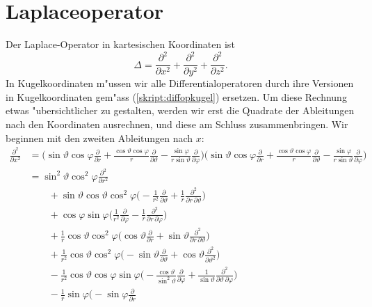 \section{Laplaceoperator}
%
Der Laplace-Operator in kartesischen Koordinaten ist
\[
\Delta
=
\frac{\partial^2}{\partial x^2}
+
\frac{\partial^2}{\partial y^2}
+
\frac{\partial^2}{\partial z^2}.
\]
In Kugelkoordinaten m"ussen wir alle Differentialoperatoren durch
ihre Versionen in Kugelkoordinaten gem"ass (\ref{skript:diffopkugel}) 
ersetzen.
Um diese Rechnung etwas "ubersichtlicher zu gestalten, werden wir erst
die Quadrate der Ableitungen nach den Koordinaten ausrechnen, und diese
am Schluss zusammenbringen.
Wir beginnen mit den zweiten Ableitungen nach $x$:
\begin{align*}
\frac{\partial^2}{\partial x^2}
&=
\biggl(
\sin\vartheta\cos\varphi
\frac{\partial}{\partial r}
+
\frac{\cos\vartheta\cos\varphi}{r}
\frac{\partial}{\partial\vartheta}
-
\frac{\sin\varphi}{r\sin\vartheta}
\frac{\partial}{\partial\varphi}
\biggr)
\biggl(
\sin\vartheta\cos\varphi
\frac{\partial}{\partial r}
+
\frac{\cos\vartheta\cos\varphi}{r}
\frac{\partial}{\partial\vartheta}
-
\frac{\sin\varphi}{r\sin\vartheta}
\frac{\partial}{\partial\varphi}
\biggr)
\\
&=
\sin^2\vartheta\cos^2\varphi\frac{\partial^2}{\partial r^2}
\\
&\qquad
+
\sin\vartheta \cos\vartheta \cos^2\varphi
\biggl(
-\frac1{r^2}
\frac{\partial}{\partial\vartheta}
+\frac1{r}
\frac{\partial^2}{\partial r\,\partial\vartheta}
\biggr)
\\
&\qquad
+
\cos\varphi\sin\varphi\biggl(
\frac1{r^2}\frac{\partial}{\partial\varphi}
-\frac1{r}\frac{\partial^2}{\partial r\,\partial\varphi}
\biggr)
\\
&\qquad
+\frac1{r}
\cos\vartheta\cos^2\varphi
\biggl(
\cos\vartheta\frac{\partial}{\partial r}
+
\sin\vartheta \frac{\partial^2}{\partial r\,\partial\vartheta}
\biggr)
\\
&\qquad
+\frac1{r^2}
\cos\vartheta\cos^2\varphi\biggl(
-\sin\vartheta
\frac{\partial}{\partial\vartheta}
+
\cos\vartheta
\frac{\partial^2}{\partial\vartheta^2}
\biggr)
\\
&\qquad
-\frac1{r^2}
\cos\vartheta\cos\varphi\sin\varphi
\biggl(
-\frac{\cos\vartheta}{\sin^2\vartheta}
\frac{\partial}{\partial\varphi}
+\frac1{\sin\vartheta}
\frac{\partial^2}{\partial\vartheta\,\partial\varphi}
\biggr)
\\
&\qquad
-\frac1r\sin\varphi\biggl(
-\sin\varphi \frac{\partial}{\partial r}

\end{align*}
